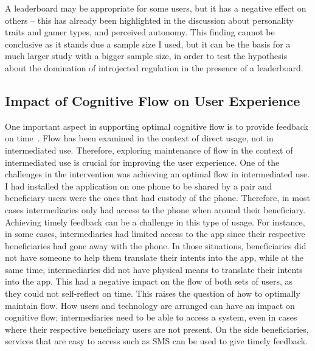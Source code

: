 A leaderboard may be appropriate for some users, but it has a negative effect on others -- this has already been highlighted in the discussion about personality traits and gamer types, and perceived autonomy. This finding cannot be conclusive as it stands due a sample size I used, but it can be the basis for a much larger study with a bigger sample size, in order to test the hypothesis about the domination of introjected regulation in the presence of a leaderboard.

\subsection{Impact of Cognitive Flow on User Experience}
One important aspect in supporting optimal cognitive flow is to provide feedback on time~\citep{csikszentmihalyiflow}. Flow has been examined in the context of direct usage, not in intermediated use. Therefore, exploring maintenance of flow in the context of intermediated use is crucial for improving the user experience. One of the challenges in the intervention was achieving an optimal flow in intermediated use. I had installed the application on one phone to be shared by a pair and beneficiary users were the ones that had custody of the phone. Therefore, in most cases intermediaries only had access to the phone when around their beneficiary. Achieving timely feedback can be a challenge in this type of usage. For instance, in some cases, intermediaries had limited access to the app since their respective beneficiaries had gone away with the phone. In those situations, beneficiaries did not have someone to help them translate their intents into the app, while at the same time, intermediaries did not have physical means to translate their intents into the app. This had a negative impact on the flow of both sets of users, as they could not self-reflect on time. This raises the question of how to optimally maintain flow. How users and technology are arranged can have an impact on cognitive flow; intermediaries need to be able to access a system, even in cases where their respective beneficiary users are not present. On the side beneficiaries, services that are easy to access such as SMS can be used to give timely feedback.

